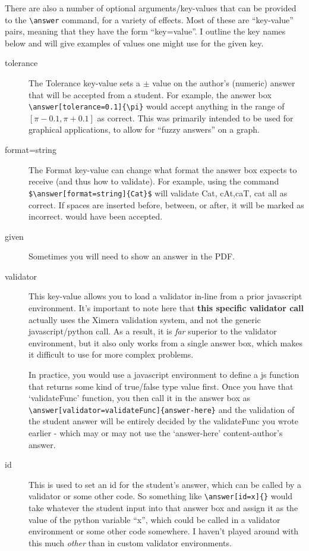 \documentclass{ximera}
\begin{document}
There are also a number of optional arguments/key-values that can be provided
to the \verb|\answer| command, for a variety of effects. Most of these are
``key-value'' pairs, meaning that they have the form ``key=value''. I outline
the key names below and will give examples of values one might use for the
given key.

\begin{description}
  \item[tolerance] The Tolerance key-value sets a $\pm$ value on the
    author's (numeric) answer that will be accepted from a student. For
    example,
    the answer box \verb|\answer[tolerance=0.1]{\pi}| would accept anything in
    the
    range of $[\pi-0.1,\pi+0.1]$ as correct. This was primarily intended to be
    used
    for graphical applications, to allow for ``fuzzy answers'' on a graph.
  \item[format=string] The Format key-value can change what format the answer
    box
    expects to receive (and thus how to validate). For example, using the
    command
    \verb|$\answer[format=string]{Cat}$| will validate Cat, cAt,caT, cat all as
    correct. If spaces are inserted before, between, or after, it will be marked as
    incorrect.
    would have been accepted.

  \item[given] Sometimes you will need to show an answer in the PDF.
  \item[validator] This key-value allows you to load a validator in-line
  from a prior javascript environment. It's important to note here that
  \textbf{this specific validator call} actually uses the Ximera validation
  system, and not the generic javascript/python call. As a result, it is
  \textit{far} superior to the validator environment, but it also only works
  from
  a single answer box, which makes it difficult to use for more complex
  problems.

  In practice, you would use a javascript environment to define a js function
  that returns some kind of true/false type value first. Once you have that
  `validateFunc' function, you then call it in the answer box as
  \verb|\answer[validator=validateFunc]{answer-here}| and the validation of
  the
  student answer will be entirely decided by the validateFunc you wrote
  earlier -
  which may or may not use the `answer-here' content-author's answer.

\item[id] This is used to set an id for the student's answer, which can be
  called by a validator or some other code. So something like
  \verb|\answer[id=x]{}| would take whatever the student input into that
  answer
  box and assign it as the value of the python variable ``x'', which could be
  called in a validator environment or some other code somewhere. I haven't
  played around with this much \textit{other} than in custom validator
  environments.

\end{description}
\end{document}
